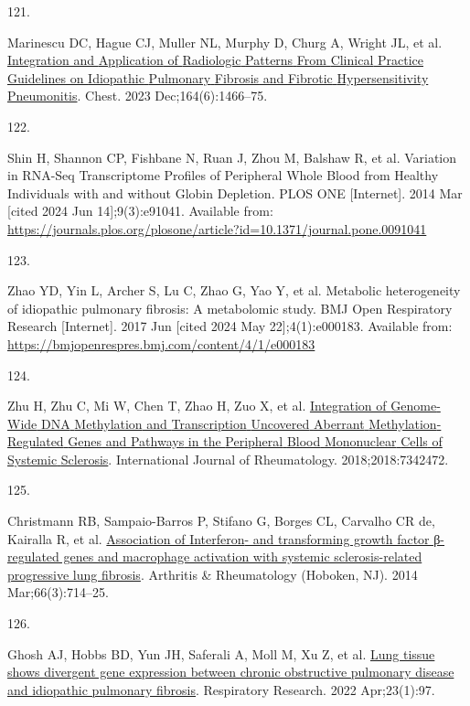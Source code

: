 \documentclass[
]{article}
\newlength{\cslhangindent}
\newlength{\csllabelwidth}
\newenvironment{CSLReferences}[2] %
 {\begin{list}{}{%
  \setlength{\itemindent}{0pt}
  \setlength{\leftmargin}{0pt}
  \setlength{\parsep}{0pt}
  \ifodd #1
   \setlength{\leftmargin}{\cslhangindent}
   \setlength{\itemindent}{-1\cslhangindent}
  \fi
  \setlength{\itemsep}{#2\baselineskip}}}
 {\end{list}}
\newcommand{\CSLLeftMargin}[1]{\parbox[t]{\csllabelwidth}{\strut#1\strut}}
\newcommand{\CSLRightInline}[1]{\parbox[t]{\linewidth - \csllabelwidth}{\strut#1\strut}}
\begin{document}
\begin{CSLReferences}{0}{1}
\CSLLeftMargin{121. }%
\CSLRightInline{Marinescu DC, Hague CJ, Muller NL, Murphy D, Churg A, Wright JL, et al. \href{https://doi.org/10.1016/j.chest.2023.07.068}{Integration and {Application} of {Radiologic} {Patterns} {From} {Clinical} {Practice} {Guidelines} on {Idiopathic} {Pulmonary} {Fibrosis} and {Fibrotic} {Hypersensitivity} {Pneumonitis}}. Chest. 2023 Dec;164(6):1466--75. }

\CSLLeftMargin{122. }%
\CSLRightInline{Shin H, Shannon CP, Fishbane N, Ruan J, Zhou M, Balshaw R, et al. Variation in {RNA}-{Seq} {Transcriptome} {Profiles} of {Peripheral} {Whole} {Blood} from {Healthy} {Individuals} with and without {Globin} {Depletion}. PLOS ONE {[}Internet{]}. 2014 Mar {[}cited 2024 Jun 14{]};9(3):e91041. Available from: \url{https://journals.plos.org/plosone/article?id=10.1371/journal.pone.0091041}}

\CSLLeftMargin{123. }%
\CSLRightInline{Zhao YD, Yin L, Archer S, Lu C, Zhao G, Yao Y, et al. Metabolic heterogeneity of idiopathic pulmonary fibrosis: A metabolomic study. BMJ Open Respiratory Research {[}Internet{]}. 2017 Jun {[}cited 2024 May 22{]};4(1):e000183. Available from: \url{https://bmjopenrespres.bmj.com/content/4/1/e000183}}

\CSLLeftMargin{124. }%
\CSLRightInline{Zhu H, Zhu C, Mi W, Chen T, Zhao H, Zuo X, et al. \href{https://doi.org/10.1155/2018/7342472}{Integration of {Genome}-{Wide} {DNA} {Methylation} and {Transcription} {Uncovered} {Aberrant} {Methylation}-{Regulated} {Genes} and {Pathways} in the {Peripheral} {Blood} {Mononuclear} {Cells} of {Systemic} {Sclerosis}}. International Journal of Rheumatology. 2018;2018:7342472. }

\CSLLeftMargin{125. }%
\CSLRightInline{Christmann RB, Sampaio-Barros P, Stifano G, Borges CL, Carvalho CR de, Kairalla R, et al. \href{https://doi.org/10.1002/art.38288}{Association of {Interferon}- and transforming growth factor β-regulated genes and macrophage activation with systemic sclerosis-related progressive lung fibrosis}. Arthritis \& Rheumatology (Hoboken, NJ). 2014 Mar;66(3):714--25. }

\CSLLeftMargin{126. }%
\CSLRightInline{Ghosh AJ, Hobbs BD, Yun JH, Saferali A, Moll M, Xu Z, et al. \href{https://doi.org/10.1186/s12931-022-02013-w}{Lung tissue shows divergent gene expression between chronic obstructive pulmonary disease and idiopathic pulmonary fibrosis}. Respiratory Research. 2022 Apr;23(1):97. }


\end{CSLReferences}
\end{document}
